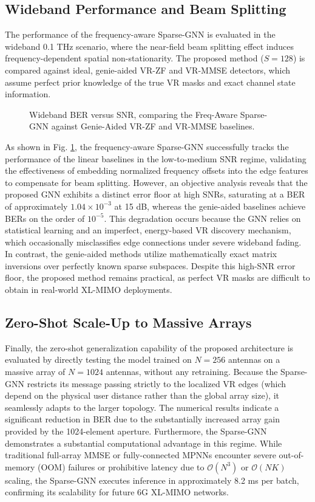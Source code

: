 \subsection{Wideband Performance and Beam Splitting}
The performance of the frequency-aware Sparse-GNN is evaluated in the wideband 0.1 THz scenario, where the near-field beam splitting effect induces frequency-dependent spatial non-stationarity. The proposed method ($S=128$) is compared against ideal, genie-aided VR-ZF and VR-MMSE detectors, which assume perfect prior knowledge of the true VR masks and exact channel state information.

\begin{figure}[t]
\centering

\caption{Wideband BER versus SNR, comparing the Freq-Aware Sparse-GNN against Genie-Aided VR-ZF and VR-MMSE baselines.}
\label{fig:ber_wideband}
\end{figure}

As shown in Fig. \ref{fig:ber_wideband}, the frequency-aware Sparse-GNN successfully tracks the performance of the linear baselines in the low-to-medium SNR regime, validating the effectiveness of embedding normalized frequency offsets into the edge features to compensate for beam splitting. However, an objective analysis reveals that the proposed GNN exhibits a distinct error floor at high SNRs, saturating at a BER of approximately $1.04 \times 10^{-3}$ at 15 dB, whereas the genie-aided baselines achieve BERs on the order of $10^{-5}$. This degradation occurs because the GNN relies on statistical learning and an imperfect, energy-based VR discovery mechanism, which occasionally misclassifies edge connections under severe wideband fading. In contrast, the genie-aided methods utilize mathematically exact matrix inversions over perfectly known sparse subspaces. Despite this high-SNR error floor, the proposed method remains practical, as perfect VR masks are difficult to obtain in real-world XL-MIMO deployments.

\subsection{Zero-Shot Scale-Up to Massive Arrays}
Finally, the zero-shot generalization capability of the proposed architecture is evaluated by directly testing the model trained on $N=256$ antennas on a massive array of $N=1024$ antennas, without any retraining. Because the Sparse-GNN restricts its message passing strictly to the localized VR edges (which depend on the physical user distance rather than the global array size), it seamlessly adapts to the larger topology. The numerical results indicate a significant reduction in BER due to the substantially increased array gain provided by the 1024-element aperture. Furthermore, the Sparse-GNN demonstrates a substantial computational advantage in this regime. While traditional full-array MMSE or fully-connected MPNNs encounter severe out-of-memory (OOM) failures or prohibitive latency due to $\mathcal{O}(N^3)$ or $\mathcal{O}(NK)$ scaling, the Sparse-GNN executes inference in approximately 8.2 ms per batch, confirming its scalability for future 6G XL-MIMO networks.